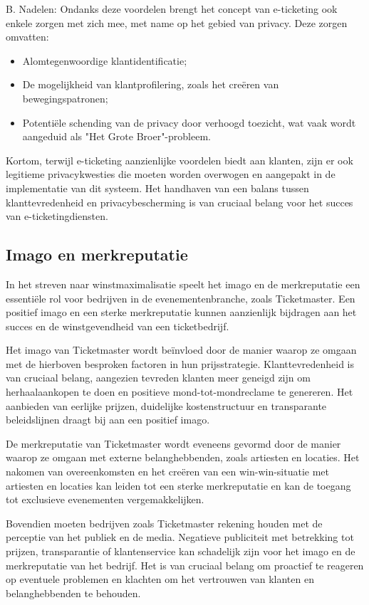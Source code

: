 B. Nadelen:
Ondanks deze voordelen brengt het concept van e-ticketing ook enkele zorgen met zich mee, met name op het gebied van privacy. Deze zorgen omvatten:
\begin{itemize}
    \item Alomtegenwoordige klantidentificatie;
    \item De mogelijkheid van klantprofilering, zoals het creëren van bewegingspatronen;
    \item Potentiële schending van de privacy door verhoogd toezicht, wat vaak wordt aangeduid als "Het Grote Broer"-probleem.
\end{itemize}

\vspace{5 mm}
Kortom, terwijl e-ticketing aanzienlijke voordelen biedt aan klanten, zijn er ook legitieme privacykwesties die moeten worden overwogen en aangepakt in de implementatie van dit systeem. Het handhaven van een balans tussen klanttevredenheid en privacybescherming is van cruciaal belang voor het succes van e-ticketingdiensten.

\subsection{Imago en merkreputatie}

In het streven naar winstmaximalisatie speelt het imago en de merkreputatie een essentiële rol voor bedrijven in de evenementenbranche, zoals Ticketmaster. Een positief imago en een sterke merkreputatie kunnen aanzienlijk bijdragen aan het succes en de winstgevendheid van een ticketbedrijf.

Het imago van Ticketmaster wordt beïnvloed door de manier waarop ze omgaan met de hierboven besproken factoren in hun prijsstrategie. Klanttevredenheid is van cruciaal belang, aangezien tevreden klanten meer geneigd zijn om herhaalaankopen te doen en positieve mond-tot-mondreclame te genereren. Het aanbieden van eerlijke prijzen, duidelijke kostenstructuur en transparante beleidslijnen draagt bij aan een positief imago.

De merkreputatie van Ticketmaster wordt eveneens gevormd door de manier waarop ze omgaan met externe belanghebbenden, zoals artiesten en locaties. Het nakomen van overeenkomsten en het creëren van een win-win-situatie met artiesten en locaties kan leiden tot een sterke merkreputatie en kan de toegang tot exclusieve evenementen vergemakkelijken.

Bovendien moeten bedrijven zoals Ticketmaster rekening houden met de perceptie van het publiek en de media. Negatieve publiciteit met betrekking tot prijzen, transparantie of klantenservice kan schadelijk zijn voor het imago en de merkreputatie van het bedrijf. Het is van cruciaal belang om proactief te reageren op eventuele problemen en klachten om het vertrouwen van klanten en belanghebbenden te behouden.

